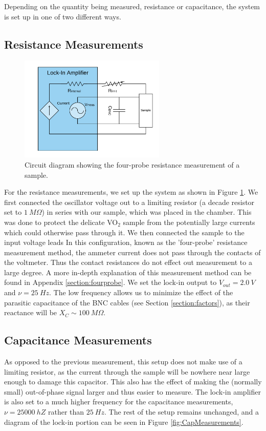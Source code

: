 \documentclass[%
 reprint,
 amsmath,amssymb,
 aps,
 pra,
]{revtex4-1}
\begin{document}
Depending on the quantity being measured, resistance or capacitance, the system is set up in one of two different ways.

\subsection{Resistance Measurements}

\begin{figure}[H]
	\centering
	\includegraphics[height=5cm]{diagram_res.png}
	\caption{Circuit diagram showing the four-probe resistance measurement of a sample.}
	\label{fig:ResistanceMeasurements}
\end{figure}

For the resistance measurements, we set up the system as shown in Figure \ref{fig:ResistanceMeasurements}. We first connected the oscillator voltage out to a limiting resistor (a decade resistor set to $1~M\Omega$) in series with our sample, which was placed in the chamber. This was done to protect the delicate VO$_2$ sample from the potentially large currents which could otherwise pass through it. We then connected the sample to the input voltage leads In this configuration, known as the 'four-probe' resistance measurement method, the ammeter current does not pass through the contacts of the voltmeter. Thus the contact resistances do not effect out measurement to a large degree. A more in-depth explanation of this measurement method can be found in Appendix \ref{section:fourprobe}. We set the lock-in output to $V_{out} = 2.0~V$ and $\nu = 25~Hz$. The low frequency allows us to minimize the effect of the parasitic capacitance of the BNC cables (see Section \ref{section:factors}), as their reactance will be $X_C \sim 100~M\Omega$.

\subsection{Capacitance Measurements}

As opposed to the previous measurement, this setup does not make use of a limiting resistor, as the current through the sample will be nowhere near large enough to damage this capacitor. This also has the effect of making the (normally small) out-of-phase signal larger and thus easier to measure. The lock-in amplifier is also set to a much higher frequency for the capacitance measurements, $\nu = 25000~hZ$ rather than $25~Hz$. The rest of the setup remains unchanged, and a diagram of the lock-in portion can be seen in Figure \ref{fig:CapMeasurements}.
\end{document}
